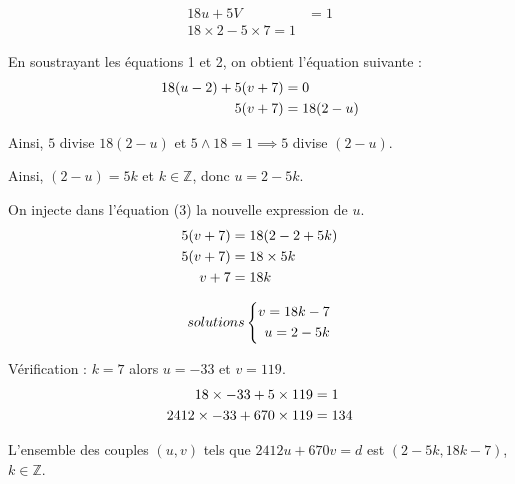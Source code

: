 \documentclass[a4paper,10pt]{article}
\newcommand{\Z}{\mathbb{Z}}
\begin{document}
\begin{enumerate}
	\begin{align}
		18u + 5V &=1 \\	
		18 \times 2 - 5 \times 7 = 1 
	\end{align}

	En soustrayant les équations 1 et 2, on obtient l'équation suivante :
	\begin{align}
		18(u-2)+5(v+7)&=0 \notag \\
		5(v+7) &= 18(2-u)  
	\end{align}

Ainsi, $5$ divise $18(2-u)$ et $5 \wedge 18=1 \implies 5$ divise $(2-u)$.

Ainsi, $(2-u)=5k$ et $ k \in \Z$, donc $u = 2-5k$.

On injecte dans l'équation (3) la nouvelle expression de $u$.
	\begin{align}
		5(v+7) &= 18(2 - 2+5k) \notag \\
		5(v + 7) &= 18 \times 5k \notag \\
		v+7 &= 18k \notag
	\end{align}

\[ solutions
\left\{
\begin{aligned}	
	v=18k-7\notag \\
	u=2-5k \notag \\	
\end{aligned}
\right.\]
\end{enumerate}

Vérification :
 $k=7$ alors $u=-33 $ et $v=119$.
\begin{align}
	18 \times -33 + 5 \times 119 &= 1 \notag \\
	2412 \times -33 + 670 \times 119 &= 134 \notag
\end{align}

L'ensemble des couples $(u,v)$ tels que $2412u + 670v = d$ est $(2-5k,18k-7)$, $ k \in \Z$.



 
\end{document}

